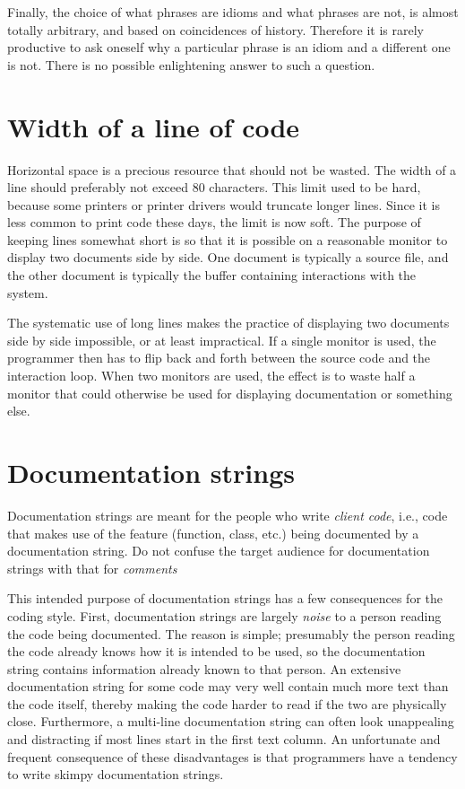 Finally, the choice of what phrases are idioms and what phrases are
not, is almost totally arbitrary, and based on coincidences of
history.  Therefore it is rarely productive to ask oneself why a
particular phrase is an idiom and a different one is not.  There is no
possible enlightening answer to such a question.


\section{Width of a line of code}

Horizontal space is a precious resource that should not be wasted.
The width of a line should preferably not exceed 80 characters.  This
limit used to be hard, because some printers or printer drivers would
truncate longer lines.  Since it is less common to print code these
days, the limit is now soft.  The purpose of keeping lines somewhat
short is so that it is possible on a reasonable monitor to display two
documents side by side.  One document is typically a \commonlisp{}
source file, and the other document is typically the buffer containing
interactions with the \commonlisp{} system.

The systematic use of long lines makes the practice of displaying two
documents side by side impossible, or at least impractical.  If a
single monitor is used, the programmer then has to flip back and forth
between the source code and the interaction loop.  When two monitors
are used, the effect is to waste half a monitor that could otherwise
be used for displaying documentation or something else.

\section{Documentation strings}
\label{sec-general-coding-style-documentation-strings}

Documentation strings are meant for the people who write \emph{client
  code}, i.e., code that makes use of the feature (function, class,
etc.) being documented by a documentation string.  Do not confuse the
target audience for documentation strings with that for
\emph{comments} 

This intended purpose of documentation strings has a few consequences
for the coding style.  First, documentation strings are largely
\emph{noise} to a person reading the code being documented.  The
reason is simple; presumably the person reading the code already knows
how it is intended to be used, so the documentation string contains
information already known to that person.  An extensive documentation
string for some code may very well contain much more text than the
code itself, thereby making the code harder to read if the two are
physically close.  Furthermore, a multi-line documentation string can
often look unappealing and distracting if most lines start in the
first text column.  An unfortunate and frequent consequence of these
disadvantages is that programmers have a tendency to write skimpy
documentation strings.


